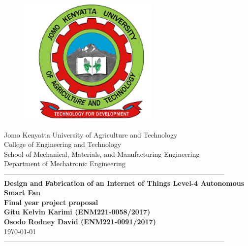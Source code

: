 \documentclass[12pt,fleqn]{article}
\newcommand{\yesthreeday}{{\AdvanceDate[-3]\today}}
\begin{document}
\begin{titlepage}
  \begin{center}
      \vspace*{-4.0cm}
    \begin{figure}[!h]
\centering
\includegraphics[width=0.3\linewidth]{Figures/JKUAT_logo}
\label{fig:jomologo}
\end{figure}
   \large{Jomo Kenyatta University of Agriculture and Technology}\\
    \large{College of Engineering and Technology}\\
    \large{School of Mechanical, Materials, and Manufacturing Engineering}\\
   \large{Department of Mechatronic Engineering}\\

    ------------------------------------------------------------------------------------------------\\[1.0cm]
    \LARGE{\textbf{Design and Fabrication of an Internet of Things Level-4 Autonomous Smart Fan}}\\[0.6cm]
    
    \LARGE{\textbf{Final year project proposal
            }}\\[1.5cm]

    \vspace{0.5cm}
    \large{\textbf{Gitu Kelvin Karimi (ENM221-0058/2017)
            }}\\
     \large{\textbf{Osodo Rodney David (ENM221-0091/2017)
            }}\\[1.0cm]

    \large{\small{\yesthreeday}}\\
    ------------------------------------------------------------------------------------------------\\[1.5cm]
  \end{center}
\end{titlepage}
%
\end{document}
